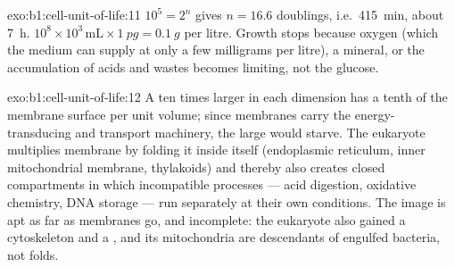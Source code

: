 \begin{solution}{exo:b1:cell-unit-of-life:11}
$10^5 = 2^{n}$ gives $n = 16.6$ doublings, i.e.\ \qty{415}{min}, about
\qty{7}{h}. $10^8\times 10^3\,\mathrm{mL}\times\qty{1}{pg} = \qty{0.1}{g}$
per litre. Growth stops because oxygen (which the medium can supply at
only a few milligrams per litre), a mineral, or the accumulation of
acids and wastes becomes limiting, not the glucose.
\end{solution}

\begin{solution}{exo:b1:cell-unit-of-life:12}
A  ten times larger in each dimension has a tenth of the membrane
surface per unit volume; since membranes carry the energy-transducing
and transport machinery, the large  would starve. The eukaryote
multiplies membrane by folding it inside itself (endoplasmic reticulum,
inner mitochondrial membrane, thylakoids) and thereby also creates
closed compartments in which incompatible processes --- acid digestion,
oxidative chemistry, DNA storage --- run separately at their own
conditions. The image is apt as far as membranes go, and incomplete:
the eukaryote also gained a cytoskeleton and a , and its
mitochondria are descendants of engulfed bacteria, not folds.
\end{solution}

